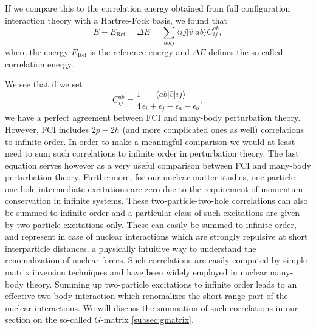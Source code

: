 If we compare this to the correlation energy obtained from full configuration interaction theory with a Hartree-Fock basis, we found that
\[
E-E_{\mathrm{Ref}} =\Delta E=\sum_{abij}\langle ij | \hat{v}| ab \rangle C_{ij}^{ab},
\]
where the energy $E_{\mathrm{Ref}}$ is the reference energy and $\Delta E$ defines the so-called correlation energy.

We see that if we set
\[
C_{ij}^{ab} =\frac{1}{4}\frac{\langle ab \vert \hat{v} \vert ij \rangle}{\epsilon_i+\epsilon_j-\epsilon_a-\epsilon_b},
\]
we have a perfect agreement between FCI and many-body perturbation
theory. However, FCI includes $2p-2h$ (and more complicated ones as
well) correlations to infinite order. In order to make a meaningful
comparison we would at least need to sum such correlations to infinite
order in perturbation theory. The last equation serves however as a
very useful comparison between FCI and many-body perturbation
theory. Furthermore, for our nuclear matter studies,
one-particle-one-hole intermediate excitations are zero due to the
requirement of momentum conservation in infinite systems. These
two-particle-two-hole correlations can also be summed to infinite
order and a particular class of such excitations are given by
two-particle excitations only. These can easily be summed to infinite
order, and represent in case of nuclear interactions which are
strongly repulsive at short interparticle distances, a physically
intuitive way to understand the renomalization of nuclear forces. Such
correlations are easily computed by simple matrix inversion techniques
and have been widely employed in nuclear many-body theory.  Summing up
two-particle excitations to infinite order leads to an effective
two-body interaction which renomalizes the short-range part of the
nuclear interactions.  We will discuss the summation of such
correlations in our section on the so-called $G$-matrix
\ref{subsec:gmatrix}.




